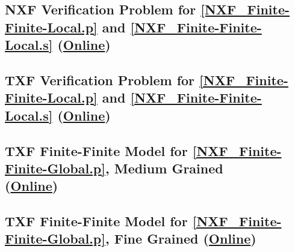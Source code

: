 \documentclass{easychair}
\begin{document}
\begin{minipage}{\textwidth}
\subsection{NXF Verification Problem for \ref{NXF_Finite-Finite-Local.p} and
\ref{NXF_Finite-Finite-Local.s}
(\href{https://raw.githubusercontent.com/GeoffsPapers/InterpretationFormat/master/Examples/NXF_Finite-Finite-Local.s.NXF.p}{Online})}
\label{NXF_Finite-Finite-Local.s.NXF.p}
\begin{scriptsize}

\end{scriptsize}
\end{minipage}

\begin{minipage}{\textwidth}
\subsection{TXF Verification Problem for \ref{NXF_Finite-Finite-Local.p} and
\ref{NXF_Finite-Finite-Local.s}
(\href{https://raw.githubusercontent.com/GeoffsPapers/InterpretationFormat/master/Examples/NXF_Finite-Finite-Local.s.p}{Online})}
\label{NXF_Finite-Finite-Local.s.p}
\begin{tiny}

\end{tiny}
\end{minipage}

\begin{minipage}{\textwidth}
\subsection{TXF Finite-Finite Model for \ref{NXF_Finite-Finite-Global.p}, Medium Grained \\
(\href{https://raw.githubusercontent.com/GeoffsPapers/InterpretationFormat/master/Examples/NXF_Finite-Finite-Global_Medium.s}{Online})}
\label{NXF_Finite-Finite-Global_Medium.s}
\begin{tiny}

\end{tiny}
\end{minipage}

\begin{minipage}{\textwidth}
\subsection{TXF Finite-Finite Model for \ref{NXF_Finite-Finite-Global.p}, Fine Grained
(\href{https://raw.githubusercontent.com/GeoffsPapers/InterpretationFormat/master/Examples/NXF_Finite-Finite-Global_Fine.s}{Online})}
\label{NXF_Finite-Finite-Global_Fine.s}
\begin{tiny}

\end{tiny}
\end{minipage}
\end{document}
